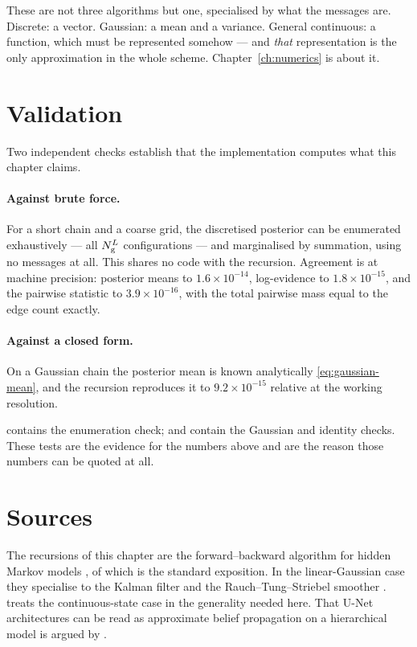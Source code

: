\begin{intuition}
These are not three algorithms but one, specialised by what the messages are. Discrete: a
vector. Gaussian: a mean and a variance. General continuous: a function, which must be
represented somehow --- and \emph{that} representation is the only approximation in the whole
scheme. Chapter~\ref{ch:numerics} is about it.
\end{intuition}

\section{Validation}
\label{sec:bp-validation}

Two independent checks establish that the implementation computes what this chapter claims.

\paragraph{Against brute force.} For a short chain and a coarse grid, the discretised
posterior can be enumerated exhaustively --- all $N_{\mathrm{g}}^{L}$ configurations --- and
marginalised by summation, using no messages at all. This shares no code with the recursion.
Agreement is at machine precision: posterior means to $1.6\times10^{-14}$, log-evidence to
$1.8\times10^{-15}$, and the pairwise statistic to $3.9\times10^{-16}$, with the total pairwise
mass equal to the edge count exactly.

\paragraph{Against a closed form.} On a Gaussian chain the posterior mean is known
analytically \eqref{eq:gaussian-mean}, and the recursion reproduces it to $9.2\times10^{-15}$
relative at the working resolution.

\begin{codebox}
 contains the enumeration check;
 and 
contain the Gaussian and identity checks. These tests are the evidence for the numbers above
and are the reason those numbers can be quoted at all.
\end{codebox}

\section*{Sources}
The recursions of this chapter are the forward--backward algorithm for hidden Markov models
\citep{baum1970}, of which \citet{rabiner1989} is the standard exposition. In the
linear-Gaussian case they specialise to the Kalman filter \citep{kalman1960} and the
Rauch--Tung--Striebel smoother \citep{rauch1965}. \citet{cappe2005} treats the continuous-state
case in the generality needed here. That U-Net architectures can be read as approximate belief
propagation on a hierarchical model is argued by \citet{mei2024unet}.
